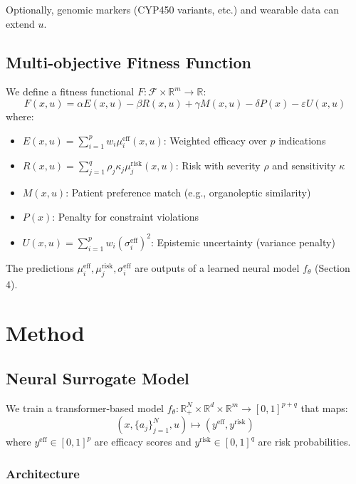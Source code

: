 \documentclass[11pt,a4paper]{article}
\begin{document}
Optionally, genomic markers (CYP450 variants, etc.) and wearable data can extend \(u\).

\subsection{Multi-objective Fitness Function}

We define a fitness functional \(F: \mathcal{F} \times \mathbb{R}^m \to \mathbb{R}\):
\begin{equation}
F(x, u) = \alpha E(x,u) - \beta R(x,u) + \gamma M(x,u) - \delta P(x) - \varepsilon U(x,u)
\end{equation}
where:
\begin{itemize}
    \item \(E(x,u) = \sum_{i=1}^p w_i \mu_i^{\text{eff}}(x,u)\): Weighted efficacy over \(p\) indications
    \item \(R(x,u) = \sum_{j=1}^q \rho_j \kappa_j \mu_j^{\text{risk}}(x,u)\): Risk with severity \(\rho\) and sensitivity \(\kappa\)
    \item \(M(x,u)\): Patient preference match (e.g., organoleptic similarity)
    \item \(P(x)\): Penalty for constraint violations
    \item \(U(x,u) = \sum_{i=1}^p w_i (\sigma_i^{\text{eff}})^2\): Epistemic uncertainty (variance penalty)
\end{itemize}

The predictions \(\mu_i^{\text{eff}}, \mu_j^{\text{risk}}, \sigma_i^{\text{eff}}\) are outputs of a learned neural model \(f_\theta\) (Section 4).

\section{Method}

\subsection{Neural Surrogate Model}

We train a transformer-based model \(f_\theta: \mathbb{R}_+^N \times \mathbb{R}^d \times \mathbb{R}^m \to [0,1]^{p+q}\) that maps:
\[
(x, \{a_j\}_{j=1}^N, u) \mapsto (y^{\text{eff}}, y^{\text{risk}})
\]
where \(y^{\text{eff}} \in [0,1]^p\) are efficacy scores and \(y^{\text{risk}} \in [0,1]^q\) are risk probabilities.

\subsubsection{Architecture}
\end{document}
